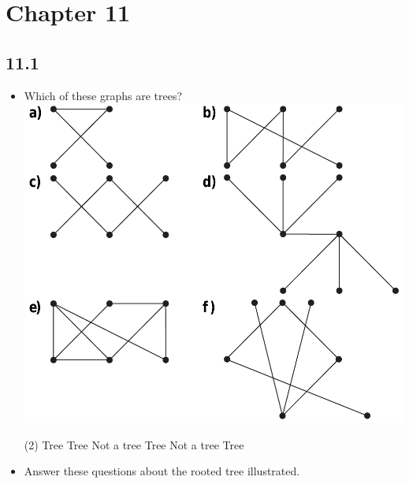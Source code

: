 \section{Chapter 11}
\subsection{11.1}
\begin{itemize}
    \item[2.] Which of these graphs are trees? \vspace{1mm}\\
          \includegraphics[scale = 0.4]{img/11_1_2_graphs.png} \\
          \answer
          \begin{tasks}(2)
              \task Tree
              \task Tree
              \task Not a tree
              \task Tree
              \task Not a tree
              \task Tree
          \end{tasks}
          \newpage
    \item[4.] Answer these questions about the rooted tree illustrated. \\

\end{itemize}
